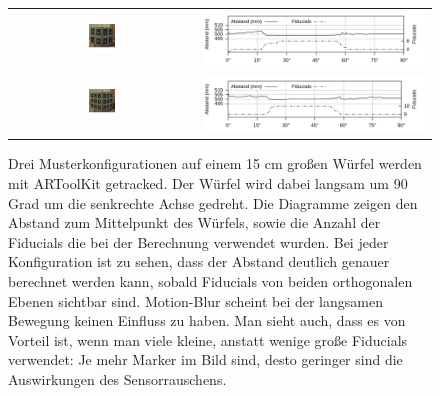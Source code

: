 \begin{figure}[h]
\begin{tabular}{cc}
   \includegraphics[width=0.15\textwidth]{../graphics/position/testcube_2x2_45_cropped.jpg} &
   \includegraphics[width=12cm]{../graphics/position/graph_marker_eval_2x2.svg} \\

    \includegraphics[width=0.15\textwidth]{../graphics/position/testcube_3x3_45_cropped.jpg} &
   \includegraphics[width=12cm]{../graphics/position/graph_marker_eval_3x3.svg}  

   \end{tabular}

    \caption[Evaluation der Fiducialgröße]{ Drei Musterkonfigurationen auf einem 15 cm großen Würfel werden mit ARToolKit getracked.
  Der Würfel wird dabei langsam um 90 Grad um die senkrechte Achse gedreht. Die Diagramme zeigen den Abstand zum Mittelpunkt des Würfels, sowie die Anzahl der Fiducials die bei der Berechnung verwendet wurden. 
   Bei jeder Konfiguration ist zu sehen, dass der Abstand deutlich genauer berechnet werden kann, sobald Fiducials von beiden orthogonalen Ebenen sichtbar sind. 
    Motion-Blur scheint bei der langsamen Bewegung keinen Einfluss zu haben.
    Man sieht auch, dass es von Vorteil ist, wenn man viele kleine, anstatt wenige große Fiducials verwendet:
     Je mehr Marker im Bild sind, desto geringer sind die Auswirkungen des Sensorrauschens.
    }  

    \label{fig:marker_size}
   \end{figure}

